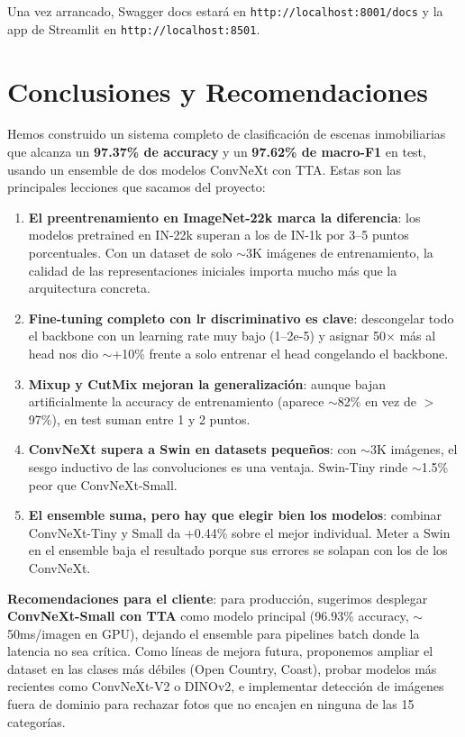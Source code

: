 \documentclass[11pt,a4paper]{article}
\begin{document}
Una vez arrancado, Swagger docs estará en \texttt{http://localhost:8001/docs} y la app de Streamlit en \texttt{http://localhost:8501}.


\section{Conclusiones y Recomendaciones}

Hemos construido un sistema completo de clasificación de escenas inmobiliarias que alcanza un \textbf{97.37\% de accuracy} y un \textbf{97.62\% de macro-F1} en test, usando un ensemble de dos modelos ConvNeXt con TTA. Estas son las principales lecciones que sacamos del proyecto:

\begin{enumerate}
    \item \textbf{El preentrenamiento en ImageNet-22k marca la diferencia}: los modelos pretrained en IN-22k superan a los de IN-1k por 3--5 puntos porcentuales. Con un dataset de solo $\sim$3K imágenes de entrenamiento, la calidad de las representaciones iniciales importa mucho más que la arquitectura concreta.

    \item \textbf{Fine-tuning completo con lr discriminativo es clave}: descongelar todo el backbone con un learning rate muy bajo (1--2e-5) y asignar 50$\times$ más al head nos dio $\sim$+10\% frente a solo entrenar el head congelando el backbone.

    \item \textbf{Mixup y CutMix mejoran la generalización}: aunque bajan artificialmente la accuracy de entrenamiento (aparece $\sim$82\% en vez de $>$97\%), en test suman entre 1 y 2 puntos.

    \item \textbf{ConvNeXt supera a Swin en datasets pequeños}: con $\sim$3K imágenes, el sesgo inductivo de las convoluciones es una ventaja. Swin-Tiny rinde $\sim$1.5\% peor que ConvNeXt-Small.

    \item \textbf{El ensemble suma, pero hay que elegir bien los modelos}: combinar ConvNeXt-Tiny y Small da +0.44\% sobre el mejor individual. Meter a Swin en el ensemble baja el resultado porque sus errores se solapan con los de los ConvNeXt.
\end{enumerate}

\textbf{Recomendaciones para el cliente}: para producción, sugerimos desplegar \textbf{ConvNeXt-Small con TTA} como modelo principal (96.93\% accuracy, $\sim$50ms/imagen en GPU), dejando el ensemble para pipelines batch donde la latencia no sea crítica. Como líneas de mejora futura, proponemos ampliar el dataset en las clases más débiles (Open Country, Coast), probar modelos más recientes como ConvNeXt-V2 o DINOv2, e implementar detección de imágenes fuera de dominio para rechazar fotos que no encajen en ninguna de las 15 categorías.
\end{document}
